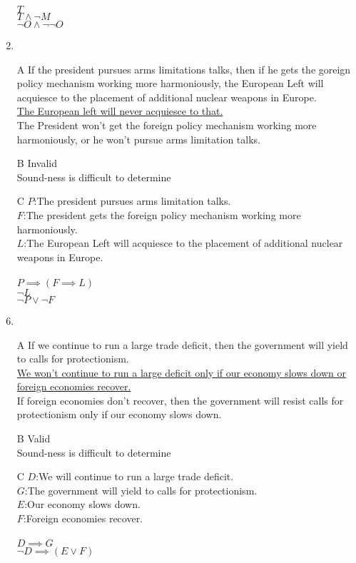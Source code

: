 \documentclass{article}
\begin{document}
\begin{enumerate}
$T$\\
\underline{$T \land \lnot M$}\\
$\lnot O \land \lnot \lnot O$
\item
\item[A]
If the president pursues arms limitations talks, then if he gets the goreign policy mechanism working more harmoniously, the European Left will acquiesce to the placement of additional nuclear weapons in Europe.
\\\underline{The European left will never acquiesce to that.}
\\The President won't get the foreign policy mechanism working more harmoniously, or he won't pursue arms limitation talks.
\item[B]
Invalid
\\Sound-ness is difficult to determine
\item[C]
$P$:The president pursues arms limitation talks.\\
$F$:The president gets the foreign policy mechanism working more harmoniously.\\
$L$:The European Left will acquiesce to the placement of additional nuclear weapons in Europe.\\
\\
$P \implies (F \implies L)$\\
\underline{$\lnot L$}\\
$\lnot P \lor \lnot F$
\item
\item[A]
If we continue to run a large trade deficit, then the government will yield to calls for protectionism.
\\\underline{We won't continue to run a large deficit only if our economy slows down or foreign economies recover.}
\\If foreign economies don't recover, then the government will resist calls for protectionism only if our economy slows down. 
\item[B]
Valid
\\Sound-ness is difficult to determine
\item[C]
$D$:We will continue to run a large trade deficit.\\
$G$:The government will yield to calls for protectionism.\\
$E$:Our economy slows down.\\
$F$:Foreign economies recover.\\
\\
$D \implies G$\\
\underline{$\lnot D \implies (E \lor F)$}\\

\end{enumerate}
\end{document}
